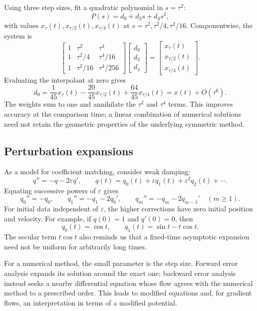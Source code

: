 Using three step sizes, fit a quadratic polynomial in \(s=\tau^2\):
\[
 P(s)=d_0+d_2s+d_4s^2,
\]
with values \(x_\tau(t),x_{\tau/2}(t),x_{\tau/4}(t)\) at
\(s=\tau^2,\tau^2/4,\tau^2/16\). Componentwise, the system is
\[
 \begin{bmatrix}
  1&\tau^2&\tau^4\\
  1&\tau^2/4&\tau^4/16\\
  1&\tau^2/16&\tau^4/256
 \end{bmatrix}
 \begin{bmatrix}d_0\\d_2\\d_4\end{bmatrix}
 =\begin{bmatrix}x_\tau(t)\\x_{\tau/2}(t)\\x_{\tau/4}(t)\end{bmatrix}.
\]
Evaluating the interpolant at zero gives
\begin{equation}\label{eq:richardson-six-sep-30}
 \boxed{d_0=\frac1{45}x_\tau(t)-\frac{20}{45}x_{\tau/2}(t)
                     +\frac{64}{45}x_{\tau/4}(t)
             =x(t)+O(\tau^6).}
\end{equation}
The weights sum to one and annihilate the \(\tau^2\) and
\(\tau^4\) terms. This improves accuracy at the comparison time;
a linear combination of numerical solutions need not retain the
geometric properties of the underlying symmetric method.

\subsection{Perturbation expansions}

As a model for coefficient matching, consider weak damping:
\[
 q''=-q-2\varepsilon q',\qquad
 q(t)=q_0(t)+\varepsilon q_1(t)+\varepsilon^2q_2(t)+\cdots.
\]
Equating successive powers of \(\varepsilon\) gives
\[
 q_0''=-q_0,\qquad
 q_1''=-q_1-2q_0',\qquad
 q_m''=-q_m-2q_{m-1}'\quad(m\geq1).
\]
For initial data independent of \(\varepsilon\), the higher
corrections have zero initial position and velocity. For example,
if \(q(0)=1\) and \(q'(0)=0\), then
\[
 q_0(t)=\cos t,\qquad q_1(t)=\sin t-t\cos t.
\]
The secular term \(t\cos t\) also reminds us that a fixed-time
asymptotic expansion need not be uniform for arbitrarily long times.

For a numerical method, the small parameter is the step size.
Forward error analysis expands its solution around the exact one;
backward error analysis instead seeks a nearby differential equation
whose flow agrees with the numerical method to a prescribed order.
This leads to modified equations and, for gradient flows, an
interpretation in terms of a modified potential.

